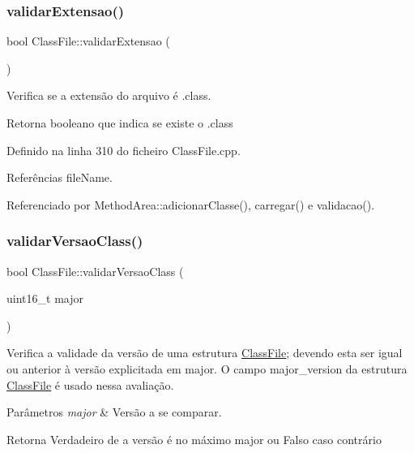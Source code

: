 \subsubsection{\texorpdfstring{validar\+Extensao()}{validarExtensao()}}
{\footnotesize\ttfamily bool Class\+File\+::validar\+Extensao (\begin{DoxyParamCaption}{ }\end{DoxyParamCaption})}



Verifica se a extensão do arquivo é .class. 

\begin{DoxyReturn}{Retorna}
booleano que indica se existe o .class 
\end{DoxyReturn}


Definido na linha 310 do ficheiro Class\+File.\+cpp.



Referências file\+Name.



Referenciado por Method\+Area\+::adicionar\+Classe(), carregar() e validacao().

\mbox{\label{classClassFile_a1dc8bb02efc19507cd93208d8477b436}} 
\subsubsection{\texorpdfstring{validar\+Versao\+Class()}{validarVersaoClass()}}
{\footnotesize\ttfamily bool Class\+File\+::validar\+Versao\+Class (\begin{DoxyParamCaption}\item[{uint16\+\_\+t}]{major }\end{DoxyParamCaption})}

Verifica a validade da versão de uma estrutura \hyperlink{classClassFile}{Class\+File}; devendo esta ser igual ou anterior à versão explicitada em major. O campo major\+\_\+version da estrutura \hyperlink{classClassFile}{Class\+File} é usado nessa avaliação. 
\begin{DoxyParams}{Parâmetros}
{\em major} & Versão a se comparar. \\
\hline
\end{DoxyParams}
\begin{DoxyReturn}{Retorna}
Verdadeiro de a versão é no máximo major ou Falso caso contrário 
\end{DoxyReturn}


